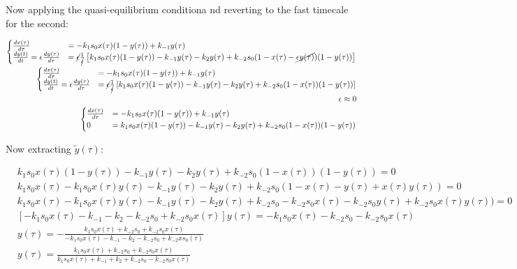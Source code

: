    Now applying the quasi-equilibrium conditiona nd reverting to the fast timecale for the second:

    \begin{align*}
      \begin{cases}
        \frac{dx(\tau)}{d\tau} &= -k_1s_0 x(\tau)(1-y(\tau)) + k_{-1} y(\tau)\\
        \frac{dy(t)}{dt} = \epsilon\frac{dy(\tau)}{d\tau} &= \cancel{\epsilon}\frac{1}{\cancel{\epsilon}}\left[k_1s_0x(\tau)(1-y(\tau)) - k_{-1}y(\tau) - k_2y(\tau) + k_{-2}s_0(1-x(\tau)-\cancel{\epsilon y(\tau)})(1-y(\tau))\right]\\
      \end{cases}\\
      \begin{cases}
        \frac{dx(\tau)}{d\tau} &= -k_1s_0 x(\tau)(1-y(\tau)) + k_{-1} y(\tau)\\
        \frac{dy(t)}{dt} = \epsilon\frac{dy(\tau)}{d\tau} &= \cancel{\epsilon}\frac{1}{\cancel{\epsilon}}\left[k_1s_0x(\tau)(1-y(\tau)) - k_{-1}y(\tau) - k_2y(\tau) + k_{-2}s_0(1-x(\tau))(1-y(\tau))\right]\\
      \end{cases}\\
      \epsilon \approx 0\\
      \begin{cases}
        \frac{dx(\tau)}{d\tau} &= -k_1s_0 x(\tau)(1-y(\tau)) + k_{-1} y(\tau)\\
        0 &= k_1s_0x(\tau)(1-y(\tau)) - k_{-1}y(\tau) - k_2y(\tau) + k_{-2}s_0(1-x(\tau))(1-y(\tau))\\
      \end{cases}\\
    \end{align*}

    Now extracting $\tilde{y}(\tau)$:

    \begin{align*}
      &k_1s_0x(\tau)(1-y(\tau)) - k_{-1}y(\tau) - k_2y(\tau) + k_{-2}s_0(1-x(\tau))(1-y(\tau)) = 0\\
      &k_1s_0x(\tau) - k_1s_0x(\tau)y(\tau) - k_{-1}y(\tau) - k_2y(\tau) + k_{-2}s_0(1-x(\tau) -y(\tau) + x(\tau)y(\tau)) = 0\\
      &k_1s_0x(\tau) - k_1s_0x(\tau)y(\tau) - k_{-1}y(\tau) - k_2y(\tau) + k_{-2}s_0-k_{-2}s_0x(\tau) -k_{-2}s_0y(\tau) + k_{-2}s_0x(\tau)y(\tau)) = 0\\
      &[-k_1s_0x(\tau)-k_{-1} - k_2 - k_{-2}s_0+k_{-2}s_0x(\tau)]y(\tau) = -k_1s_0x(\tau) - k_{-2}s_0 - k_{-2}s_0x(\tau)\\
      &y(\tau) = -\frac{k_1s_0x(\tau) + k_{-2}s_0 + k_{-2}s_0x(\tau)}{-k_1s_0x(\tau)-k_{-1} - k_2 - k_{-2}s_0+k_{-2}xs_0(\tau)}\\
      &y(\tau) = \frac{k_1s_0x(\tau) + k_{-2}s_0 + k_{-2}s_0x(\tau)}{k_1s_0x(\tau)+k_{-1} + k_2 + k_{-2}s_0-k_{-2}s_0x(\tau)}\\
    \end{align*}

